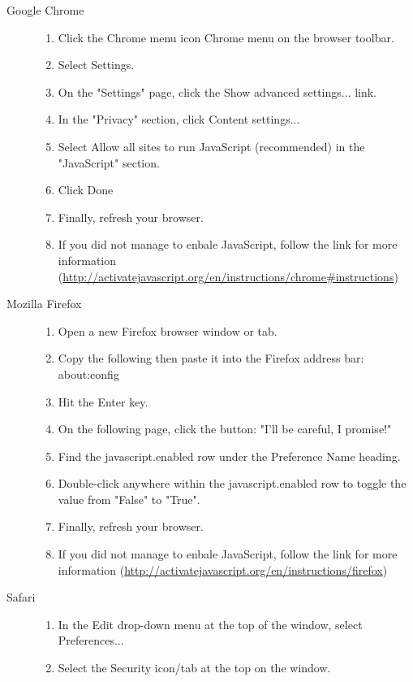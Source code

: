\begin{description} 
\item[Google Chrome] \hfill 
\begin{enumerate}
\item Click the Chrome menu icon Chrome menu on the browser toolbar.
\item Select Settings.
\item On the "Settings" page, click the Show advanced settings... link.
\item In the "Privacy" section, click Content settings...
\item Select Allow all sites to run JavaScript (recommended) in the "JavaScript" section.
\item Click Done
\item Finally, refresh your browser.
\item If you did not manage to enbale JavaScript, follow the link for more information (\href{http://activatejavascript.org/en/instructions/chrome\#instructions}{http://activatejavascript.org/en/instructions/chrome\#instructions})
\end{enumerate}
\item[Mozilla Firefox] \hfill 
\begin{enumerate}
\item Open a new Firefox browser window or tab.
\item Copy the following then paste it into the Firefox address bar: about:config
\item Hit the Enter key.
\item On the following page, click the button: "I'll be careful, I promise!"
\item Find the javascript.enabled row under the Preference Name heading.
\item Double-click anywhere within the javascript.enabled row to toggle the value from "False" to "True".
\item Finally, refresh your browser.
\item If you did not manage to enbale JavaScript, follow the link for more information (\href{http://activatejavascript.org/en/instructions/firefox}{http://activatejavascript.org/en/instructions/firefox})
\end{enumerate}
\item[Safari] \hfill 
\begin{enumerate}
\item In the Edit drop-down menu at the top of the window, select Preferences...
\item Select the Security icon/tab at the top on the window.

\end{enumerate}
\end{description}

